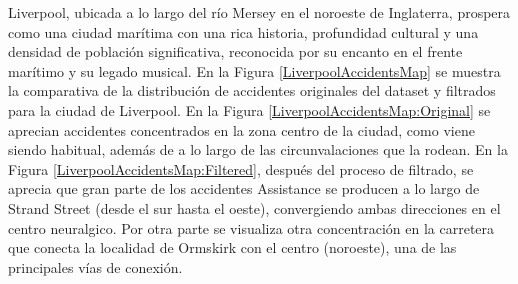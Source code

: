 \documentclass{uathesis-es}
\begin{document}
Liverpool, ubicada a lo largo del río Mersey en el noroeste de Inglaterra, prospera como una ciudad marítima con una rica historia, profundidad cultural y una densidad de población significativa, reconocida por su encanto en el frente marítimo y su legado musical. En la Figura \ref{LiverpoolAccidentsMap} se muestra la comparativa de la distribución de accidentes originales del dataset y filtrados para la ciudad de Liverpool. En la Figura \ref{LiverpoolAccidentsMap:Original} se aprecian accidentes concentrados en la zona centro de la ciudad, como viene siendo habitual, además de a lo largo de las circunvalaciones que la rodean. En la Figura \ref{LiverpoolAccidentsMap:Filtered}, después del proceso de filtrado, se aprecia que gran parte de los accidentes Assistance se producen a lo largo de Strand Street (desde el sur hasta el oeste), convergiendo ambas direcciones en el centro neuralgico. Por otra parte se visualiza otra concentración en la carretera que conecta la localidad de Ormskirk con el centro (noroeste), una de las principales vías de conexión.
\end{document}
